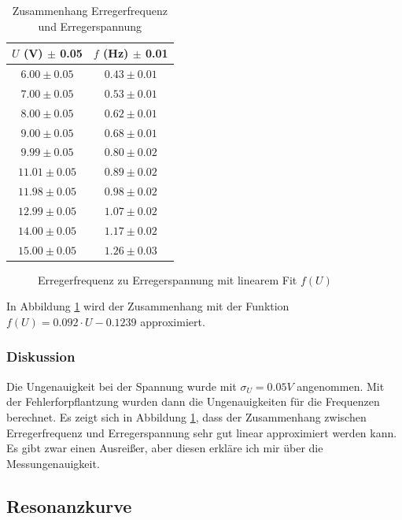 \documentclass{article}
\begin{document}
\begin{table}[H]
    \centering
    \begin{tabular}{|c|c|}
    \hline
    $U$ (V) $\pm$ 0.05 & $f$ (Hz) $\pm$ 0.01 \\
    \hline
    $6.00 \pm 0.05$ & $0.43 \pm 0.01$ \\
    $7.00 \pm 0.05$ & $0.53 \pm 0.01$ \\
    $8.00 \pm 0.05$ & $0.62 \pm 0.01$ \\
    $9.00 \pm 0.05$ & $0.68 \pm 0.01$ \\
    $9.99 \pm 0.05$ & $0.80 \pm 0.02$ \\
    $11.01 \pm 0.05$ & $0.89 \pm 0.02$ \\
    $11.98 \pm 0.05$ & $0.98 \pm 0.02$ \\
    $12.99 \pm 0.05$ & $1.07 \pm 0.02$ \\
    $14.00 \pm 0.05$ & $1.17 \pm 0.02$ \\
    $15.00 \pm 0.05$ & $1.26 \pm 0.03$ \\
    \hline
    \end{tabular}
    \caption{Zusammenhang Erregerfrequenz und Erregerspannung}
    \label{tab:erregerfrequenz_spannung}
\end{table}

\begin{figure}[H]
    \centering
    
    \caption{Erregerfrequenz zu Erregerspannung mit linearem Fit $f(U)$}
    \label{fig:erreger_fit}
\end{figure}

In Abbildung \ref{fig:erreger_fit} wird der Zusammenhang mit der Funktion $f(U) = 0.092 \cdot U - 0.1239$ approximiert.

\subsubsection{Diskussion}
Die Ungenauigkeit bei der Spannung wurde mit $\sigma_{U} = 0.05 V$ angenommen. Mit der Fehlerforpflantzung wurden dann die
Ungenauigkeiten für die Frequenzen berechnet.
Es zeigt sich in Abbildung \ref{fig:erreger_fit}, dass der Zusammenhang zwischen Erregerfrequenz und Erregerspannung sehr gut linear approximiert
werden kann. Es gibt zwar einen Ausreißer, aber diesen erkläre ich mir über die Messungenauigkeit.

\subsection{Resonanzkurve}
\end{document}
